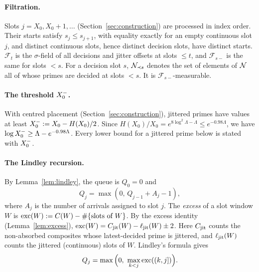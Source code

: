 \paragraph{Filtration.}
Slots $j=X_0,X_0+1,\dots$ (Section~\ref{sec:construction}) are processed in index order. Their starts satisfy $s_j\le s_{j+1}$,
with equality exactly for an empty continuous slot $j$, and distinct continuous slots, hence distinct decision slots, have
distinct starts. $\mathcal F_t$ is the $\sigma$-field of
all decisions and jitter offsets at slots $\le t$, and $\mathcal F_{s-}$ is the same for slots $<s$. For a decision slot $s$,
$\mathcal{N}_{\prec s}$ denotes the set of elements of $\mathcal{N}$ all of whose primes are decided at slots $<s$. It is
$\mathcal F_{s-}$-measurable.

\paragraph{The threshold $X_0^{-}$.}
With centred placement (Section~\ref{sec:construction}), jittered primes have values at least
$X_0^{-}:=X_0-H(X_0)/2$. Since $H(X_0)/X_0=e^{8\log^2\Lambda-\Lambda}\le e^{-0.98\Lambda}$, we have
$\log X_0^{-}\ge\Lambda-e^{-0.98\Lambda}$. Every lower bound for a jittered prime below is stated with $X_0^{-}$.

\paragraph{The Lindley recursion.}
By Lemma~\ref{lem:lindley}, the queue is $Q_0=0$ and
\begin{equation}\label{eq:lindley}
Q_j=\max(0,\,Q_{j-1}+A_j-1),
\end{equation}
where $A_j$ is the number of arrivals assigned to slot $j$. The \emph{excess} of a slot window $W$ is
$\operatorname{exc}(W):=C(W)-\#\{\text{slots of }W\}$. By the excess identity (Lemma~\ref{lem:excess}),
$\operatorname{exc}(W)=C_{\mathrm{jit}}(W)-\ell_{\mathrm{jit}}(W)\pm2$. Here $C_{\mathrm{jit}}$ counts the non-absorbed composites whose latest-decided prime is
jittered, and $\ell_{\mathrm{jit}}(W)$ counts the jittered (continuous) slots of $W$. Lindley's formula gives
\begin{equation}\label{eq:lindleymax}
Q_j=\max\Big(0,\ \max_{k<j}\operatorname{exc}((k,j])\Big).
\end{equation}

